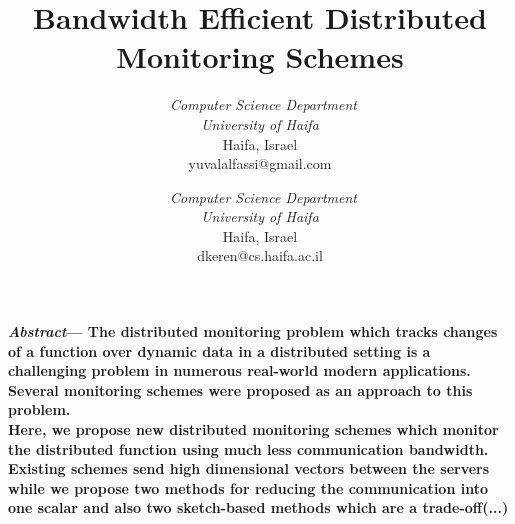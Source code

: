 \documentclass[10pt, conference]{IEEEtran}
\begin{document}
\title{Bandwidth Efficient Distributed Monitoring Schemes}
\author{\
\textit{Computer Science Department}\\
\textit{University of Haifa}\\
Haifa, Israel \\
yuvalalfassi@gmail.com
\and
{}\
\textit{Computer Science Department}\\
\textit{University of Haifa}\\
Haifa, Israel \\
dkeren@cs.haifa.ac.il}
\maketitle


\begin{small}
\textbf{
\textit{Abstract}--- The distributed monitoring problem which tracks changes of a function over dynamic data in a distributed setting is a challenging problem in numerous real-world modern applications. Several monitoring schemes were proposed as an approach to this problem. \\
Here, we propose new distributed monitoring schemes which monitor the distributed function using much less communication bandwidth. Existing schemes send high dimensional vectors between the servers while we propose two methods for reducing the communication into one scalar and also two sketch-based methods which are a trade-off(...)}
\end{small}

\end{document}
